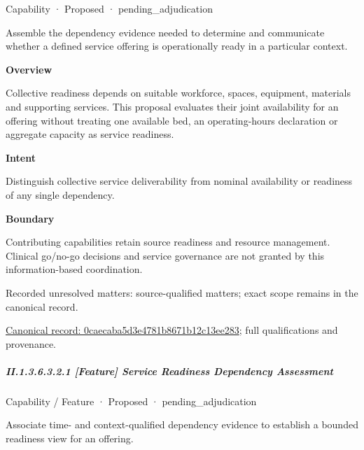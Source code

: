 \label{element:0caecaba5d3e4781b8671b12c13ee283}
{\small Capability · Proposed · pending\_adjudication}\par

Assemble the dependency evidence needed to determine and communicate whether a defined service offering is operationally ready in a particular context.



\textbf{Overview}



Collective readiness depends on suitable workforce, spaces, equipment, materials and supporting services. This proposal evaluates their joint availability for an offering without treating one available bed, an operating-hours declaration or aggregate capacity as service readiness.



\textbf{Intent}



Distinguish collective service deliverability from nominal availability or readiness of any single dependency.



\textbf{Boundary}



Contributing capabilities retain source readiness and resource management. Clinical go/no-go decisions and service governance are not granted by this information-based coordination.


{\small Recorded unresolved matters: source-qualified matters; exact scope remains in the canonical record.}\par
{\footnotesize \href{../../../../continuum/strategy/capability/0caecaba5d3e4781b8671b12c13ee283.md}{Canonical record: 0caecaba5d3e4781b8671b12c13ee283}; full qualifications and provenance.}\par
\subparagraph*{II.1.3.6.3.2.1 [Feature] Service Readiness Dependency Assessment}
\label{navigation:II.1.3.6.3.2.1}

\label{element:4d917929d5cf43218049a84cf46662b0}
{\small Capability / Feature · Proposed · pending\_adjudication}\par

Associate time- and context-qualified dependency evidence to establish a bounded readiness view for an offering.



